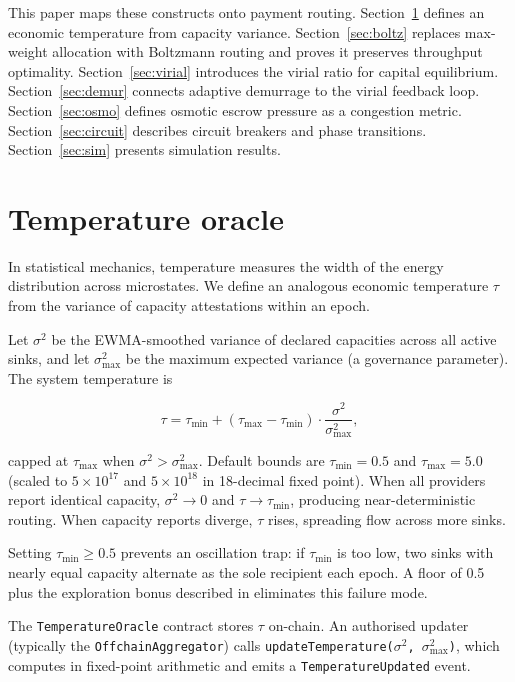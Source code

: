 \documentclass[11pt]{article}
\theoremstyle{definition}
\theoremstyle{remark}
\begin{document}
This paper maps these constructs onto payment routing. Section~\ref{sec:temp}
defines an economic temperature from capacity variance.
Section~\ref{sec:boltz} replaces max-weight allocation with Boltzmann routing
and proves it preserves throughput optimality. Section~\ref{sec:virial}
introduces the virial ratio for capital equilibrium.
Section~\ref{sec:demur} connects adaptive demurrage to the virial feedback
loop. Section~\ref{sec:osmo} defines osmotic escrow pressure as a
congestion metric. Section~\ref{sec:circuit} describes circuit breakers and
phase transitions. Section~\ref{sec:sim} presents simulation results.

\section{Temperature oracle}
\label{sec:temp}

In statistical mechanics, temperature measures the width of the energy
distribution across microstates. We define an analogous economic
temperature $\tau$ from the variance of capacity attestations
within an epoch.

Let $\sigma^2$ be the EWMA-smoothed variance of declared capacities
across all active sinks, and let $\sigma^2_{\max}$ be the maximum
expected variance (a governance parameter). The system temperature is

\begin{equation}
  \tau = \tau_{\min} + (\tau_{\max} - \tau_{\min})
         \cdot \frac{\sigma^2}{\sigma^2_{\max}},
  \label{eq:temperature}
\end{equation}

\noindent capped at $\tau_{\max}$ when $\sigma^2 > \sigma^2_{\max}$.
Default bounds are $\tau_{\min} = 0.5$ and $\tau_{\max} = 5.0$
(scaled to $5 \times 10^{17}$ and $5 \times 10^{18}$ in 18-decimal
fixed point). When all providers report identical capacity, $\sigma^2
\to 0$ and $\tau \to \tau_{\min}$, producing near-deterministic
routing. When capacity reports diverge, $\tau$ rises, spreading flow
across more sinks.

Setting $\tau_{\min} \geq 0.5$ prevents an oscillation trap: if
$\tau_{\min}$ is too low, two sinks with nearly equal capacity
alternate as the sole recipient each epoch. A floor of 0.5 plus the
exploration bonus described in  eliminates this
failure mode.

The \texttt{TemperatureOracle} contract stores $\tau$ on-chain.
An authorised updater (typically the \texttt{OffchainAggregator})
calls \texttt{updateTemperature($\sigma^2$, $\sigma^2_{\max}$)},
which computes  in fixed-point arithmetic and
emits a \texttt{TemperatureUpdated} event.
\end{document}
